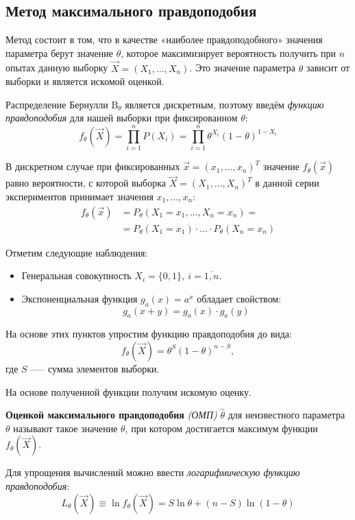 \subsection{Метод максимального правдоподобия}

Метод состоит в том, что в качестве «наиболее правдоподобного» значения параметра берут значение \( \theta \), которое максимизирует вероятность получить при \( n \) опытах данную выборку \( \vec{X}=(X_1, \ldots ,X_n) \). Это значение параметра \( \theta \) зависит от выборки и является искомой оценкой.

Распределение Бернулли \( \textrm{B}_\theta \) является дискретным, поэтому введём \textit{функцию правдоподобия} для нашей выборки при фиксированном \( \theta \):
\[
f_\theta(\vec{X}) = \prod_{i=1}^n P(X_i) = \prod_{i=1}^n \theta^{X_i}(1−\theta)^{1−X_i}
\]

В дискретном случае при фиксированных \( \vec{x}=(x_1,\ldots,x_n)^T \) значение \( f_\theta(\vec{x}) \) равно вероятности, с которой выборка \( \vec{X}=(X_1,\ldots,X_n)^T \) в данной серии экспериментов принимает значения \( x_1,\ldots,x_n \):
\[
    \begin{aligned}
        f_\theta(\vec{x}) &= P_\theta(X_1=x_1, \ldots, X_n=x_n)= \\
        &= P_\theta(X_1=x_1) \cdot \ldots \cdot P_\theta(X_n=x_n)
    \end{aligned}
\]

Отметим следующие наблюдения:
\begin{itemize}
    \item Генеральная совокупность \( X_i=\{0,1\},\ i=\overline{1,n} \).
    \item Экспоненциальная функция \( g_a(x)=a^x \) обладает свойством:
    \[
        g_a(x+y)=g_a(x)\cdot g_a(y)
    \]
\end{itemize}

На основе этих пунктов упростим функцию правдоподобия до вида:
\[
   f_\theta(\vec{X}) = \theta^S (1−\theta)^{n−S},
\]
где \( S \) —-- сумма элементов выборки.

На основе полученной функции получим искомую оценку.

\textbf{Оценкой максимального правдоподобия} \textit{(ОМП)} \( \hat{\theta} \) для неизвестного параметра \( \theta \) называют такое значение \( \theta \), при котором достигается максимум функции \( f_\theta(\vec{X}) \).

Для упрощения вычислений можно ввести \textit{логарифмическую функцию правдоподобия}:
\[
    L_\theta(\vec{X}) \equiv \ln f_\theta(\vec{X})= S\ln \theta + (n-S)\ln(1-\theta)
\]

